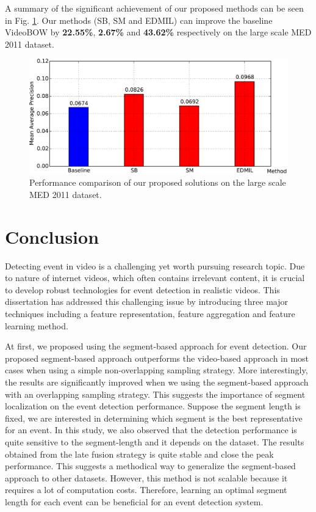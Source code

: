 A summary of the significant achievement of our proposed methods can be seen in Fig. \ref{c6_summary}. Our methods (SB, SM and EDMIL) can improve the baseline VideoBOW by \textbf{22.55\%}, \textbf{2.67\%} and \textbf{43.62\%} respectively on the large scale MED 2011 dataset.

\begin{figure}
	\centering
	\includegraphics[width=1\textwidth]{summary.pdf}
	\caption{Performance comparison of our proposed solutions on the large scale MED 2011 dataset.}
	\label{c6_summary}
\end{figure}
	
\section{Conclusion}	
	Detecting event in video is a challenging yet worth pursuing research topic. Due to nature of internet videos, which often contains irrelevant content, it is crucial to develop robust technologies for event detection in realistic videos. This dissertation has addressed this challenging issue by introducing three major techniques including a feature representation, feature aggregation and feature learning method.
	
	At first, we proposed using the segment-based approach for event detection. Our proposed segment-based approach outperforms the video-based approach in most cases when using a simple non-overlapping sampling strategy. More interestingly, the results are significantly improved when we using the segment-based approach with an overlapping sampling strategy.  This suggests the importance of segment localization on the event detection performance. Suppose the segment length is fixed, we are interested in determining which segment is the best representative for an event. In this study, we also observed that the detection performance is quite sensitive to the segment-length and it depends on the dataset. The results obtained from the late fusion strategy is quite stable and close the peak performance. This suggests a methodical way to generalize the segment-based approach to other datasets. However, this method is not scalable because it requires a lot of computation costs. Therefore, learning an optimal segment length for each event can be beneficial for an event detection system.
	
